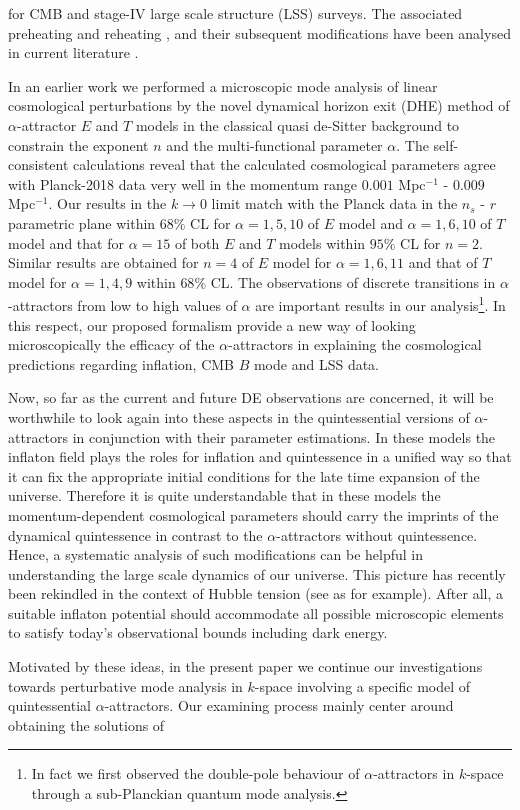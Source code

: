 \documentclass[a4paper,11pt]{article}
\begin{document}
\cite{Akrami:2017cir,Garcia-Garcia:2018hlc,Garcia-Garcia:2019ees,Akrami:2020zxw} for CMB and stage-IV large scale structure (LSS) surveys. The associated preheating \cite{Dimopoulos:2017tud} and reheating \cite{AresteSalo:2021lmp,Salo:2021vdv}, and their subsequent modifications have been analysed in current literature \cite{Salo:2021vdv,Salo:2021piz,deHaro:2022vxc,deHaro:2022ukj}.
\par In an earlier work \cite{Sarkar:2021ird} we performed a microscopic mode analysis of linear cosmological perturbations by the novel dynamical horizon exit (DHE) method of $\alpha$-attractor $E$ and $T$ models in the classical quasi de-Sitter background to constrain the exponent $n$ and the multi-functional parameter $\alpha$. The self-consistent calculations reveal that the calculated cosmological parameters agree with Planck-2018 data very well in the momentum range $0.001$ Mpc$^{-1}$ - $0.009$ Mpc$^{-1}$. Our results in the $k\rightarrow 0$ limit match with the Planck data in the $n_s$ - $r$ parametric plane within $68\%$ CL for $\alpha = 1,5,10$ of $E$ model and $\alpha= 1,6,10$ of $T$ model and that for $\alpha=15$ of both $E$ and $T$ models within $95\%$ CL for $n=2$. Similar results are obtained for $n=4$ of $E$ model for $\alpha=1,6,11$ and that of $T$ model for $\alpha=1,4,9$ within $68\%$ CL. The observations of discrete transitions in $\alpha$-attractors from low to high values of $\alpha$ are important results in our analysis\footnote{In fact we first observed the double-pole behaviour of $\alpha$-attractors in $k$-space through a sub-Planckian quantum mode analysis.}. In this respect, our proposed formalism provide a new way of looking microscopically the efficacy of the $\alpha$-attractors in explaining the cosmological predictions regarding inflation, CMB $B$ mode and LSS data.\par Now, so far as the current and future DE observations \cite{Garcia-Garcia:2019ees,Akrami:2017cir,Garcia-Garcia:2018hlc,Akrami:2020zxw} are concerned, it will be worthwhile to look again into these aspects in the quintessential versions of $\alpha$-attractors in conjunction with their parameter estimations. In these models the inflaton field plays the roles for inflation and quintessence in a unified way so that it can fix the appropriate initial conditions for the late time expansion of the universe. Therefore it is quite understandable that in these models the momentum-dependent cosmological parameters should carry the imprints of the dynamical quintessence in contrast to the $\alpha$-attractors without quintessence. Hence, a systematic analysis of such modifications can be helpful in understanding the large scale dynamics of our universe. This picture has recently been rekindled in the context of Hubble tension (see \cite{Brissenden:2023yko} as for example). After all, a suitable inflaton potential should accommodate all possible microscopic elements to satisfy today's observational bounds including dark energy.\par Motivated by these ideas, in the present paper we continue our investigations towards perturbative mode analysis in $k$-space involving a specific model of quintessential $\alpha$-attractors. Our examining process mainly center around obtaining the solutions of 
\end{document}
